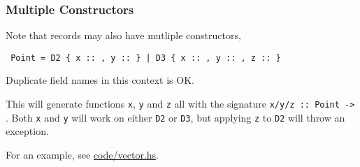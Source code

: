 \subsubsection{Multiple Constructors}
Note that records may also have mutliple constructors,

\texttt{ Point = D2 \{ x :: , y ::  \} | D3 \{ x :: , y :: , z ::  \}}

Duplicate field names in this context is OK.

This will generate functions \texttt{x}, \texttt{y} and \texttt{z} all with the signature \texttt{x/y/z :: Point -> }. Both \texttt{x} and \texttt{y} will work on either \texttt{D2} or \texttt{D3}, but applying \texttt{z} to \texttt{D2} will throw an exception.

For an example, see \url{code/vector.hs}.